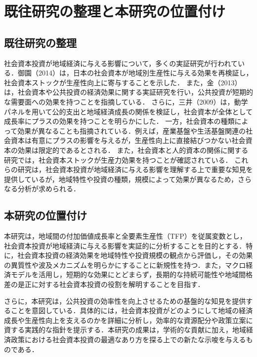 \chapter{既往研究の整理と本研究の位置付け}

\section{既往研究の整理}
社会資本投資が地域経済に与える影響について，多くの実証研究が行われている．御園（2014）\cite{misono2014}は，日本の社会資本が地域別生産性に与える効果を再検証し，社会資本ストックが生産性向上に寄与することを示した． また，金（2013）\cite{kim2013}は，社会資本や公共投資の経済効果に関する実証研究を行い，公共投資が短期的な需要面への効果を持つことを指摘している． さらに，三井（2009）\cite{mitsui2009}は，動学パネルを用いて公的支出と地域経済成長の関係を検証し，社会資本が全体として成長率にプラスの効果を持つことを明らかにした． 一方，社会資本の種類によって効果が異なることも指摘されている．例えば，産業基盤や生活基盤関連の社会資本は有意にプラスの影響を与えるが，生産性向上に直接結びつかない社会資本の効果は限定的であるとされる\cite{mitsui2010}． また，社会資本と人的資本の関係に関する研究では，社会資本ストックが生産力効果を持つことが確認されている\cite{yamano2007}． これらの研究は，社会資本投資が地域経済に与える影響を理解する上で重要な知見を提供しているが，地域特性や投資の種類，規模によって効果が異なるため，さらなる分析が求められる．

\section{本研究の位置付け}
本研究は，地域間の付加価値成長率と全要素生産性（TFP）を従属変数とし，社会資本投資が地域経済に与える影響を実証的に分析することを目的とする．特に，社会資本投資の経済効果を地域特性や投資規模の観点から評価し，その効果の異質性や波及メカニズムを明らかにすることに新規性を持つ．また，マクロ経済モデルを活用し，短期的な効果にとどまらず，長期的な持続可能性や地域間格差の是正に対する社会資本投資の役割を解明することを目指す．

さらに，本研究は，公共投資の効率性を向上させるための基盤的な知見を提供することを意図している．具体的には，社会資本投資がどのようにして地域の経済成長や生産性向上を支えるのかを詳細に分析し，効率的な資源配分や政策立案に資する実践的な指針を提示する．本研究の成果は，学術的な貢献に加え，地域経済政策における社会資本投資の最適なあり方を探る上での新たな示唆を与えるものである．

